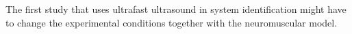 The first study that uses ultrafast ultrasound in system identification might have to change the experimental conditions together with the neuromuscular model. 











